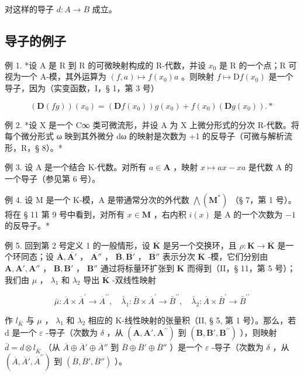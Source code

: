 对这样的导子 \(d: A \rightarrow B\) 成立。

\subsection{导子的例子}

例 1. *设 A 是 R 到 R 的可微映射构成的 R-代数，并设 \(x_0\) 是 R 的一个点；R 可视为一个 A-模，其外运算为 \((f, a) \mapsto f(x_0)a\) 。则映射 \(f \mapsto \mathrm{D}f(x_0)\) 是一个导子，因为（实变函数，I，§ 1，第 3 号）

\[
(\mathbf {D} (f g)) (x _ {0}) = (\mathbf {D} f (x _ {0})) g (x _ {0}) + f (x _ {0}) (\mathbf {D} g (x _ {0})). *
\]

例 2. *设 X 是一个 C∞ 类可微流形，并设 A 为 X 上微分形式的分次 R-代数。将每个微分形式 ω 映到其外微分 dω 的映射是次数为 +1 的反导子（可微与解析流形，R，§ 8）。*

例 3. 设 A 是一个结合 K-代数。对所有 \(a \in \mathbf{A}\) ，映射 \(x \mapsto ax - xa\) 是代数 A 的一个导子（参见第 6 号）。

例 4. 设 M 是一个 K-模，A 是带通常分次的外代数 \(\bigwedge (\mathbf{M}^{*})\) （§ 7，第 1 号）。将在 § 11 第 9 号中看到，对所有 \(x\in \mathbf{M}\) ，右内积 \(i(x)\) 是 A 的一个次数为 \(-1\) 的反导子。*

例 5. 回到第 2 号定义 1 的一般情形，设 \(\overline{\mathbf{K}}\) 是另一个交换环，且 \(\rho: \mathbf{K} \to \overline{\mathbf{K}}\) 是一个环同态；设 \(\overline{\mathbf{A}}, \overline{\mathbf{A}'}\) ， \(\overline{\mathbf{A}''}\) ， \(\overline{\mathbf{B}}, \overline{\mathbf{B}'}\) ， \(\overline{\mathbf{B}''}\) 表示分次 \(\overline{\mathbf{K}}\) -模，它们分别由 \(\mathbf{A}, \mathbf{A}', \mathbf{A}''\) ， \(\mathbf{B}, \mathbf{B}'\) ， \(\mathbf{B}''\) 通过将标量环扩张到 \(\overline{\mathbf{K}}\) 而得到（II，§ 11，第 5 号）；我们由 \(\mu\) ， \(\lambda_1\) 和 \(\lambda_2\) 导出 \(\overline{\mathbf{K}}\) -双线性映射

\[
\bar {\mu}: \overline {{{A}}} \times \overline {{{A}}} ^ {\prime} \rightarrow \overline {{{A}}} ^ {\prime \prime}, \quad \bar {\lambda} _ {1}: \bar {B} \times \overline {{{A}}} ^ {\prime} \rightarrow \bar {B} ^ {\prime \prime}, \quad \bar {\lambda} _ {2}: \overline {{{A}}} \times \bar {B} ^ {\prime} \rightarrow \bar {B} ^ {\prime \prime}
\]

作 \(l_{\bar{K}}\) 与 \(\mu\) ， \(\lambda_{1}\) 和 \(\lambda_{2}\) 相应的 K-线性映射的张量积（II, § 5, 第 1 号）。那么，若 d 是一个 \(\varepsilon\) -导子（次数为 \(\delta\) ，从 \((\mathbf{A}, \mathbf{A}', \mathbf{A}^{\prime\prime})\) 到 \((\mathbf{B}, \mathbf{B}', \mathbf{B}^{\prime\prime})\) ），则映射 \(\bar{d} = d \otimes l_{\bar{K}}\) （从 \(\overline{A} \oplus \overline{A}' \oplus \overline{A}''\) 到 \(\overline{B} \oplus \overline{B}' \oplus \overline{B}''\) ）是一个 \(\varepsilon\) -导子（次数为 \(\delta\) ，从 \((\overline{A}, \overline{A}', \overline{A}^{\prime\prime})\) 到 \((\overline{B}, \overline{B}', \overline{B}'' )\) ）。

